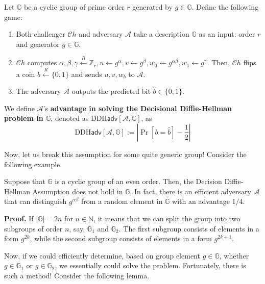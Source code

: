 \documentclass[../lecture-notes.tex]{subfiles}
\begin{document}
\begin{definition}
    Let $\mathbb{G}$ be a cyclic group of prime order $r$ generated by $g \in \mathbb{G}$. Define the following game:
    \begin{enumerate}
        \item Both challenger $\mathcal{C}h$ and adversary $\mathcal{A}$ take a description $\mathbb{G}$ as an input: order $r$ and generator $g \in \mathbb{G}$.
        \item $\mathcal{C}h$ computes $\alpha, \beta,\gamma \xleftarrow{R} \mathbb{Z}_r, u \gets g^{\alpha}, v \gets g^{\beta}, w_0 \gets g^{\alpha\beta}, w_1 \gets g^{\gamma}$. Then, $\mathcal{C}h$ flips a coin $b \xleftarrow{R} \{0,1\}$ and sends $u,v,w_b$ to $\mathcal{A}$.
        \item The adversary $\mathcal{A}$ outputs the predicted bit $\hat{b} \in \{0,1\}$.
    \end{enumerate}

    We define $\mathcal{A}$'s \textbf{advantage in solving the Decisional Diffie-Hellman problem in $\mathbb{G}$}, denoted as $\text{DDH}\mathsf{adv}[\mathcal{A},\mathbb{G}]$, as
    \begin{equation}
        \text{DDH}\mathsf{adv}[\mathcal{A},\mathbb{G}] := \left| \Pr[b = \hat{b}] - \frac{1}{2} \right|
    \end{equation}
\end{definition}

Now, let us break this assumption for some quite generic group! Consider the following example.

\begin{theorem}
    Suppose that $\mathbb{G}$ is a cyclic group of an even order. Then, the Decision
    Diffie-Hellman Assumption does not hold in $\mathbb{G}$. In fact, there is an efficient adversary $\mathcal{A}$ that can distinguish $g^{\alpha\beta}$ from a random element in $\mathbb{G}$ with an advantage $1/4$.
\end{theorem}

\textbf{Proof.} If $|\mathbb{G}|=2n$ for $n \in \mathbb{N}$, it means that we can split the group into two subgroups of order $n$, say, $\mathbb{G}_1$ and $\mathbb{G}_2$. The first subgroup consists of elements in a form $g^{2k}$, while the second subgroup consists of elements in a form $g^{2k+1}$.

Now, if we could efficiently determine, based on group element $g \in \mathbb{G}$, whether $g \in \mathbb{G}_1$ or $g \in \mathbb{G}_2$, we essentially could solve the problem. Fortunately, there is such a method! Consider the following lemma.
\end{document}
